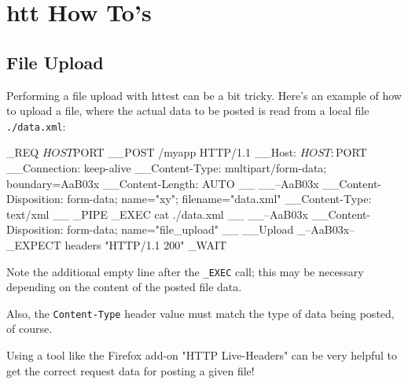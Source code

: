 \chapter{htt How To's}
\label{chap:howtos}

\section{File Upload}

Performing a file upload with httest can be a bit tricky. Here's an example of 
how to upload a file, where the actual data to be posted is read from a local 
file \texttt{./data.xml}:

\begin{usplisting}
    _REQ $HOST $PORT
    __POST /myapp HTTP/1.1
    __Host: $HOST:$PORT
    __Connection: keep-alive
    __Content-Type: multipart/form-data; boundary=AaB03x
    __Content-Length: AUTO
    __
    __--AaB03x
    __Content-Disposition: form-data; name="xy"; filename="data.xml"
    __Content-Type: text/xml
    __
    _PIPE
    _EXEC cat ./data.xml
    __
    __--AaB03x
    __Content-Disposition: form-data; name="file_upload"
    __
    __Upload
    _--AaB03x--
    _EXPECT headers "HTTP/1.1 200"
    _WAIT
\end{usplisting}

Note the additional empty line after the \texttt{\_EXEC} call; this may be necessary 
depending on the content of the posted file data.

Also, the \texttt{Content-Type} header value must match the type of data 
being posted, of course.

Using a tool like the Firefox add-on "HTTP Live-Headers" can be very helpful to 
get the correct request data for posting a given file!
